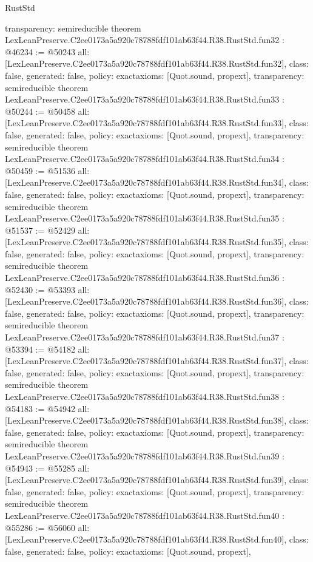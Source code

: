 \begin{lexlean}{RustStd}
\begin{coremodule}
{  transparency: semireducible
}
theorem LexLeanPreserve.C2ee0173a5a920c78788fdf101ab63f44.R38.RustStd.fun32 : @46234 := @50243 {
  all: [LexLeanPreserve.C2ee0173a5a920c78788fdf101ab63f44.R38.RustStd.fun32],
  class: false,
  generated: false,
  policy: exact{axioms: [Quot.sound, propext]},
  transparency: semireducible
}
theorem LexLeanPreserve.C2ee0173a5a920c78788fdf101ab63f44.R38.RustStd.fun33 : @50244 := @50458 {
  all: [LexLeanPreserve.C2ee0173a5a920c78788fdf101ab63f44.R38.RustStd.fun33],
  class: false,
  generated: false,
  policy: exact{axioms: [Quot.sound, propext]},
  transparency: semireducible
}
theorem LexLeanPreserve.C2ee0173a5a920c78788fdf101ab63f44.R38.RustStd.fun34 : @50459 := @51536 {
  all: [LexLeanPreserve.C2ee0173a5a920c78788fdf101ab63f44.R38.RustStd.fun34],
  class: false,
  generated: false,
  policy: exact{axioms: [Quot.sound, propext]},
  transparency: semireducible
}
theorem LexLeanPreserve.C2ee0173a5a920c78788fdf101ab63f44.R38.RustStd.fun35 : @51537 := @52429 {
  all: [LexLeanPreserve.C2ee0173a5a920c78788fdf101ab63f44.R38.RustStd.fun35],
  class: false,
  generated: false,
  policy: exact{axioms: [Quot.sound, propext]},
  transparency: semireducible
}
theorem LexLeanPreserve.C2ee0173a5a920c78788fdf101ab63f44.R38.RustStd.fun36 : @52430 := @53393 {
  all: [LexLeanPreserve.C2ee0173a5a920c78788fdf101ab63f44.R38.RustStd.fun36],
  class: false,
  generated: false,
  policy: exact{axioms: [Quot.sound, propext]},
  transparency: semireducible
}
theorem LexLeanPreserve.C2ee0173a5a920c78788fdf101ab63f44.R38.RustStd.fun37 : @53394 := @54182 {
  all: [LexLeanPreserve.C2ee0173a5a920c78788fdf101ab63f44.R38.RustStd.fun37],
  class: false,
  generated: false,
  policy: exact{axioms: [Quot.sound, propext]},
  transparency: semireducible
}
theorem LexLeanPreserve.C2ee0173a5a920c78788fdf101ab63f44.R38.RustStd.fun38 : @54183 := @54942 {
  all: [LexLeanPreserve.C2ee0173a5a920c78788fdf101ab63f44.R38.RustStd.fun38],
  class: false,
  generated: false,
  policy: exact{axioms: [Quot.sound, propext]},
  transparency: semireducible
}
theorem LexLeanPreserve.C2ee0173a5a920c78788fdf101ab63f44.R38.RustStd.fun39 : @54943 := @55285 {
  all: [LexLeanPreserve.C2ee0173a5a920c78788fdf101ab63f44.R38.RustStd.fun39],
  class: false,
  generated: false,
  policy: exact{axioms: [Quot.sound, propext]},
  transparency: semireducible
}
theorem LexLeanPreserve.C2ee0173a5a920c78788fdf101ab63f44.R38.RustStd.fun40 : @55286 := @56060 {
  all: [LexLeanPreserve.C2ee0173a5a920c78788fdf101ab63f44.R38.RustStd.fun40],
  class: false,
  generated: false,
  policy: exact{axioms: [Quot.sound, propext]},
}
\end{coremodule}
\end{lexlean}
